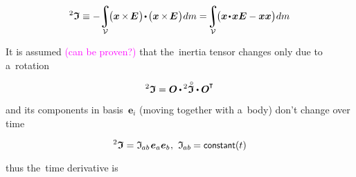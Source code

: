 \nopagebreak\begin{equation*}
\inertiatensor
\equiv
- \hspace{-0.4ex} \integral_{\mathcal{V}} \hspace{-0.4ex} \bigl( \bm{x} \hspace{-0.1ex} \times \hspace{-0.22ex} \UnitDyad \hspace{.1ex} \bigr) \hspace{-0.3ex} \dotp \hspace{-0.2ex} \bigl( \bm{x} \hspace{-0.1ex} \times \hspace{-0.22ex} \UnitDyad \hspace{.1ex} \bigr) \hspace{.1ex} dm
=
\hspace{-0.4ex} \integral_{\mathcal{V}} \hspace{-0.4ex} \bigl( \bm{x} \narrowdotp \bm{x} \UnitDyad - \bm{x} \bm{x} \bigr) \hspace{.1ex} dm
\end{equation*}

It is assumed \textcolor{magenta}{(can be proven?)} that the~inertia tensor changes only due to a~rotation

\vspace{-0.1em}\begin{equation*}
\inertiatensor = \rotationtensor \hspace{-0.1ex} \dotp \inertiatensorcircabove \dotp \rotationtensor^{\hspace{-0.1ex}\T}
\end{equation*}

\vspace{-0.1em}\noindent
and its components in basis~${\bm{e}_i}$ (moving together with a~body) don’t change over time

\nopagebreak\vspace{-0.1em}\begin{equation*}
\inertiatensor = \inertiatensorcomponents{ab} \hspace{.1ex} \bm{e}_a \bm{e}_b
\hspace{.1ex} , \hspace{.8ex}
\inertiatensorcomponents{ab} \hspace{-0.2ex} = \constant(t)
\vspace{-0.2em}
\end{equation*}

\vspace{-0.1em}\noindent
thus the~time derivative is

